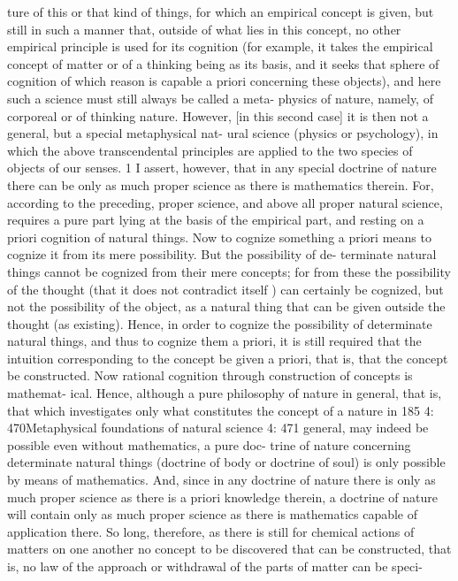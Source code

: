 ture of this or that kind of things, for which an empirical concept is given,
but still in such a manner that, outside of what lies in this concept, no
other empirical principle is used for its cognition (for example, it takes the
empirical concept of matter or of a thinking being as its basis, and it seeks
that sphere of cognition of which reason is capable a priori concerning
these objects), and here such a science must still always be called a meta-
physics of nature, namely, of corporeal or of thinking nature. However,
[in this second case] it is then not a general, but a special metaphysical nat-
ural science (physics or psychology), in which the above transcendental
principles are applied to the two species of objects of our senses. 1
I assert, however, that in any special doctrine of nature there can be
only as much proper science as there is mathematics therein. For, according
to the preceding, proper science, and above all proper natural science,
requires a pure part lying at the basis of the empirical part, and resting on
a priori cognition of natural things. Now to cognize something a priori
means to cognize it from its mere possibility. But the possibility of de-
terminate natural things cannot be cognized from their mere concepts;
for from these the possibility of the thought (that it does not contradict
itself ) can certainly be cognized, but not the possibility of the object, as a
natural thing that can be given outside the thought (as existing). Hence,
in order to cognize the possibility of determinate natural things, and thus
to cognize them a priori, it is still required that the intuition corresponding
to the concept be given a priori, that is, that the concept be constructed.
Now rational cognition through construction of concepts is mathemat-
ical. Hence, although a pure philosophy of nature in general, that is,
that which investigates only what constitutes the concept of a nature in
185
4: 470Metaphysical foundations of natural science
4: 471
general, may indeed be possible even without mathematics, a pure doc-
trine of nature concerning determinate natural things (doctrine of body
or doctrine of soul) is only possible by means of mathematics. And, since
in any doctrine of nature there is only as much proper science as there is
a priori knowledge therein, a doctrine of nature will contain only as much
proper science as there is mathematics capable of application there.
So long, therefore, as there is still for chemical actions of matters on
one another no concept to be discovered that can be constructed, that is,
no law of the approach or withdrawal of the parts of matter can be speci-
